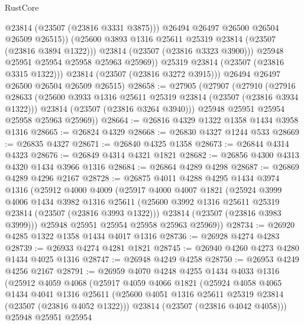 \begin{lexlean}{RustCore}
\begin{coremodule}
                      @23814
                      (@23507 (@23816 @3331 @3875)))
                    @26494
                    @26497
                    @26500
                    @26504
                    @26509
                    @26515))
                (@25600 @3893 @1316 @25611 @25319 @23814 (@23507 (@23816 @3894 @1322)))
                @23814
                (@23507 (@23816 @3323 @3900)))
              @25948
              @25951
              @25954
              @25958
              @25963
              @25969))
          @25319
          @23814
          (@23507 (@23816 @3315 @1322)))
        @23814
        (@23507 (@23816 @3272 @3915)))
      @26494
      @26497
      @26500
      @26504
      @26509
      @26515)
@28658 := @27905
    (@27907
      (@27910
        (@27916
          @28633
          (@25600 @3933 @1316 @25611 @25319 @23814 (@23507 (@23816 @3934 @1322)))
          @23814
          (@23507 (@23816 @3264 @3940)))
        @25948
        @25951
        @25954
        @25958
        @25963
        @25969))
@28664 := @26816 @4329 @1322 @1358 @1434 @3958 @1316
@28665 := @26824 @4329
@28668 := @26830 @4327 @1244 @533
@28669 := @26835 @4327
@28671 := @26840 @4325 @1358
@28673 := @26844 @4314 @4323
@28676 := @26849 @4314 @4321 @1821
@28682 := @26856 @4300 @4313 @4320 @1434 @3966 @1316
@28684 := @26864 @4289 @4298
@28687 := @26869 @4289 @4296 @2167
@28728 := @26875
    @4011
    @4288
    @4295
    @1434
    @3974
    @1316
    (@25912
      @4000
      @4009
      (@25917
        @4000
        @4007
        @1821
        (@25924
          @3999
          @4006
          @1434
          @3982
          @1316
          @25611
          (@25600 @3992 @1316 @25611 @25319 @23814 (@23507 (@23816 @3993 @1322)))
          @23814
          (@23507 (@23816 @3983 @3999)))
        @25948
        @25951
        @25954
        @25958
        @25963
        @25969))
@28734 := @26920 @4285 @1322 @1358 @1434 @4017 @1316
@28736 := @26928 @4274 @4283
@28739 := @26933 @4274 @4281 @1821
@28745 := @26940 @4260 @4273 @4280 @1434 @4025 @1316
@28747 := @26948 @4249 @4258
@28750 := @26953 @4249 @4256 @2167
@28791 := @26959
    @4070
    @4248
    @4255
    @1434
    @4033
    @1316
    (@25912
      @4059
      @4068
      (@25917
        @4059
        @4066
        @1821
        (@25924
          @4058
          @4065
          @1434
          @4041
          @1316
          @25611
          (@25600 @4051 @1316 @25611 @25319 @23814 (@23507 (@23816 @4052 @1322)))
          @23814
          (@23507 (@23816 @4042 @4058)))
        @25948
        @25951
        @25954

\end{coremodule}
\end{lexlean}
